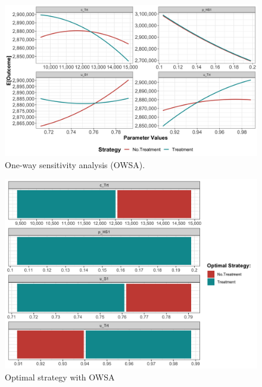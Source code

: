 \documentclass[]{book}
\begin{document}
\begin{figure}

{\centering \includegraphics[width=41.67in]{../figs/05b_owsa_lrm_nmb} 

}

\caption{One-way sensitivity analysis (OWSA).}\label{fig:05b-owsa-lrm-nmb}
\end{figure}

\begin{figure}

{\centering \includegraphics[width=33.33in]{../figs/05b_optimal_owsa_lrm_nmb} 

}

\caption{Optimal strategy with OWSA}\label{fig:05b-optimal-owsa-lrm-nmb}
\end{figure}
\end{document}
